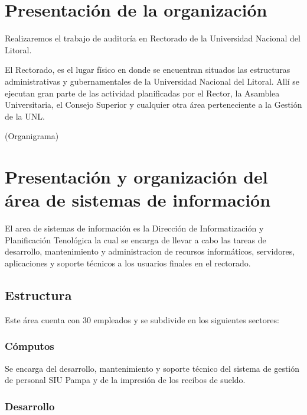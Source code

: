 \documentclass[a4paper,11pt,oneside]{article}
\begin{document}
\maketitle
%

\section{Presentación de la organización}

Realizaremos el trabajo de auditoría en Rectorado de la Universidad
Nacional del Litoral.

El Rectorado, es el lugar físico en donde se encuentran situados las
estructuras administrativas y gubernamentales de la Universidad
Nacional del Litoral. Allí se ejecutan gran parte de las actividad
planificadas por el Rector, la Asamblea Universitaria, el Consejo
Superior y cualquier otra área perteneciente a la Gestión de la UNL.

(Organigrama)

\section{Presentación y organización del área de sistemas de información}

El area de sistemas de información es la Dirección de Informatización
y Planificación Tenológica la cual se encarga de llevar a cabo las
tareas de desarrollo, mantenimiento y administracion de recursos
informáticos, servidores, aplicaciones y soporte técnicos a los
usuarios finales en el rectorado.

\subsection*{Estructura}

Este área cuenta con 30 empleados y se subdivide en los siguientes sectores:

\subsubsection*{Cómputos}

Se encarga del desarrollo, mantenimiento y soporte técnico del sistema de gestión de personal SIU Pampa y de la impresión de los recibos de sueldo.

\subsubsection*{Desarrollo}
\end{document}
